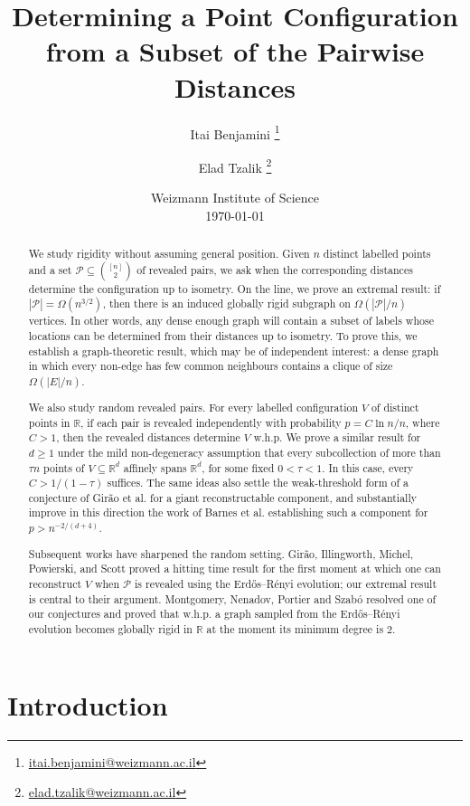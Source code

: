 \documentclass[fullpage,11pt]{article}
\title{Determining a Point Configuration from a Subset of the Pairwise Distances}
\author{Itai Benjamini \thanks{\href{mailto:itai.benjamini@weizmann.ac.il}{itai.benjamini@weizmann.ac.il}}
\and Elad Tzalik \thanks{\href{mailto:elad.tzalik@weizmann.ac.il}{elad.tzalik@weizmann.ac.il}}
}
\date{
Weizmann Institute of Science \\[2ex]
\today
}
\theoremstyle{break}
\theoremstyle{definition}
\theoremstyle{break}
\begin{document}
\maketitle

\begin{abstract}
    We study rigidity without assuming general position. Given \(n\) distinct labelled points and a set \(\mathcal{P}\subseteq \binom{[n]}{2}\) of revealed pairs, we ask when the corresponding distances determine the configuration up to isometry. On the line, we prove an extremal result: if \(|\mathcal{P}|=\Omega(n^{3/2})\), then there is an induced globally rigid subgraph on \(\Omega(|\mathcal{P}|/n)\) vertices. In other words, any dense enough graph will contain a subset of labels whose locations can be determined from their distances up to isometry. To prove this, we establish a graph-theoretic result, which may be of independent interest: a dense graph in which every non-edge has few common neighbours contains a clique of size \(\Omega(|E|/n)\).

We also study random revealed pairs. For every labelled configuration \(V\) of distinct points in \(\mathbb R\), if each pair is revealed independently with probability \(p=C\ln n/n\), where \(C>1\), then the revealed distances determine \(V\) w.h.p. We prove a similar result for \(d\ge1\) under the mild non-degeneracy assumption that every subcollection of more than \(\tau n\) points of \(V\subseteq\mathbb R^d\) affinely spans \(\mathbb R^d\), for some fixed \(0<\tau<1\). In this case, every \(C>1/(1-\tau)\) suffices. The same ideas also settle the weak-threshold form of a conjecture of Girão et al. for a giant reconstructable component, and substantially improve in this direction the work of Barnes et al. establishing such a component for \(p>n^{-2/(d+4)}\).

Subsequent works have sharpened the random setting. Girão, Illingworth, Michel, Powierski, and Scott proved a hitting time result for the first moment at which one can reconstruct \(V\) when \(\mathcal{P}\) is revealed using the Erdős--Rényi evolution; our extremal result is central to their argument. Montgomery, Nenadov, Portier and Szabó resolved one of our conjectures and proved that w.h.p. a graph sampled from the Erdős--Rényi evolution becomes globally rigid in \(\mathbb{R}\) at the moment its minimum degree is \(2\).

\end{abstract}

\section{Introduction}
\end{document}
